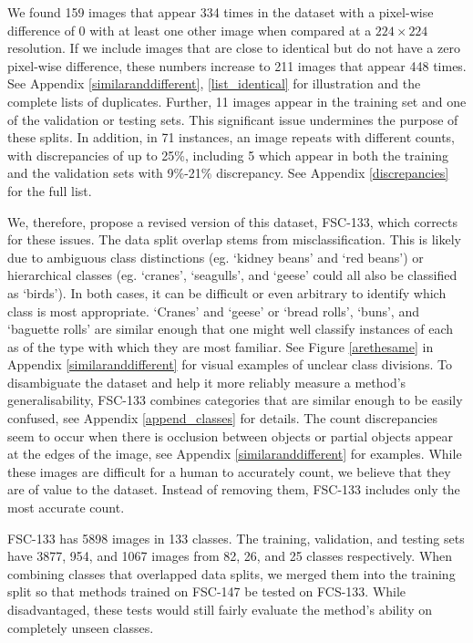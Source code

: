 \documentclass[letterpaper, 11pt]{IEEEtran}
\begin{document}
We found 159 images that appear 334 times in the dataset with a pixel-wise difference of 0 with at least one other image when compared at a $224 \times 224$ resolution.
If we include images that are close to identical but do not have a zero pixel-wise difference, these numbers increase to 211 images that appear 448 times.
See Appendix  \ref{similaranddifferent}, \ref{list_identical} for illustration 
and the complete lists of duplicates.
Further, 11 images appear in the training set and one of the validation or testing sets.
This significant issue undermines the purpose of these splits. In addition, in 71 instances, an image repeats with different counts,  with discrepancies of up to 25\%, including 5 which appear in both the training and the validation sets with 9\%-21\% discrepancy. See Appendix  \ref{discrepancies} for the full list.

We, therefore, propose a revised version of this dataset, FSC-133, which corrects for these issues.
The data split overlap stems from misclassification. This is likely due  to ambiguous class distinctions (eg. `kidney beans' and `red beans') or hierarchical classes (eg. `cranes', `seagulls', and `geese' could all also be classified as `birds'). In both cases, it can be difficult or even arbitrary to identify which class is most appropriate. 
`Cranes' and `geese' or `bread rolls', `buns', and `baguette rolls' are similar enough that one might well classify instances of each as of the type with which they are most familiar. See Figure \ref{arethesame} in Appendix  \ref{similaranddifferent} for visual examples of unclear class divisions.
To disambiguate the dataset and help it more reliably measure a method's generalisability, FSC-133 combines categories that are similar enough to be easily confused, see Appendix  \ref{append_classes} for details.
The count discrepancies seem to occur when there is occlusion between objects or partial objects appear at the edges of the image, see Appendix  \ref{similaranddifferent} for examples. 
While these images are difficult for a human to accurately count, we believe that they are of value to the dataset. Instead of removing them, FSC-133 includes only the most accurate count.

FSC-133 has 5898 images in 133 classes. The training, validation, and testing sets have 3877, 954, and 1067 images from 82, 26, and 25 classes respectively.
When combining classes that overlapped data splits, we merged them into the training split so that methods trained on FSC-147 be tested on FCS-133. While disadvantaged, these tests would still fairly evaluate the method's ability on completely unseen classes.
\end{document}
